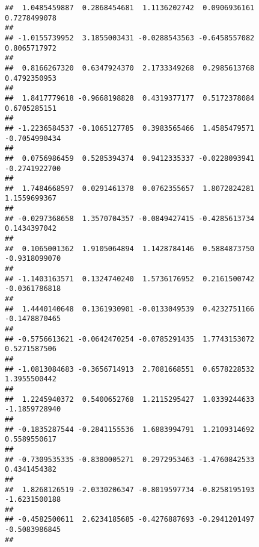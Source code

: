 \documentclass[]{article}
\begin{document}
\begin{verbatim}
##  1.0485459887  0.2868454681  1.1136202742  0.0906936161  0.7278499078 
##                                                                       
## -1.0155739952  3.1855003431 -0.0288543563 -0.6458557082  0.8065717972 
##                                                                       
##  0.8166267320  0.6347924370  2.1733349268  0.2985613768  0.4792350953 
##                                                                       
##  1.8417779618 -0.9668198828  0.4319377177  0.5172378084  0.6705285151 
##                                                                       
## -1.2236584537 -0.1065127785  0.3983565466  1.4585479571 -0.7054990434 
##                                                                       
##  0.0756986459  0.5285394374  0.9412335337 -0.0228093941 -0.2741922700 
##                                                                       
##  1.7484668597  0.0291461378  0.0762355657  1.8072824281  1.1559699367 
##                                                                       
## -0.0297368658  1.3570704357 -0.0849427415 -0.4285613734  0.1434397042 
##                                                                       
##  0.1065001362  1.9105064894  1.1428784146  0.5884873750 -0.9318099070 
##                                                                       
## -1.1403163571  0.1324740240  1.5736176952  0.2161500742 -0.0361786818 
##                                                                       
##  1.4440140648  0.1361930901 -0.0133049539  0.4232751166 -0.1478870465 
##                                                                       
## -0.5756613621 -0.0642470254 -0.0785291435  1.7743153072  0.5271587506 
##                                                                       
## -1.0813084683 -0.3656714913  2.7081668551  0.6578228532  1.3955500442 
##                                                                       
##  1.2245940372  0.5400652768  1.2115295427  1.0339244633 -1.1859728940 
##                                                                       
## -0.1835287544 -0.2841155536  1.6883994791  1.2109314692  0.5589550617 
##                                                                       
## -0.7309535335 -0.8380005271  0.2972953463 -1.4760842533  0.4341454382 
##                                                                       
##  1.8268126519 -2.0330206347 -0.8019597734 -0.8258195193 -1.6231500188 
##                                                                       
## -0.4582500611  2.6234185685 -0.4276887693 -0.2941201497 -0.5083986845 
##                                                                       

\end{verbatim}
\end{document}
